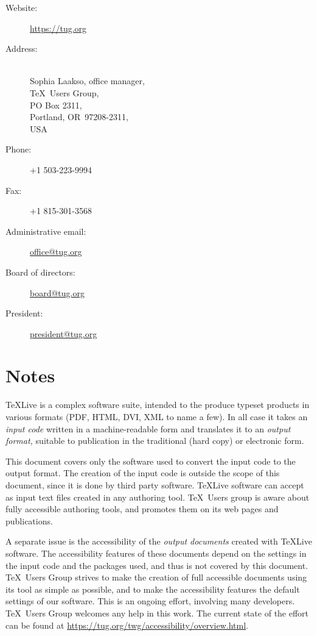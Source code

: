 \documentclass[titlepage]{article}
\begin{document}
  \begin{description}
  \item[Website:]  \url{https://tug.org}
  \item[Address:] \leavevmode\\
    Sophia Laakso, office manager,\\
    \TeX\ Users Group,\\
    PO Box 2311,\\
    Portland, OR~97208-2311,\\
    USA
  \item[Phone:] +1 503-223-9994
  \item[Fax:] +1 815-301-3568
  \item[Administrative email:] \href{mailto:office@tug.org}{office@tug.org}
  \item[Board of directors:] \href{mailto:board@tug.org}{board@tug.org}
  \item[President:] \href{mailto:president@tug.org}{president@tug.org}
  \end{description}

\newpage

\section{Notes}
\label{sec:note}

  
\TeX Live is a complex software suite, intended to the produce typeset
products in various formats (PDF, HTML, DVI, XML to name a few).  In
all case it takes an \emph{input code} written in a machine-readable
form and translates it to an \emph{output format,} suitable to
publication in the traditional (hard copy) or electronic form.

This document covers only the software used to convert the input code
to the output format.  The creation of the input code is outside the
scope of this document, since it is done by third party software.
\TeX Live software can accept as input text files created in any
authoring tool.  \TeX\ Users group is aware about fully accessible
authoring tools, and promotes them on its web pages and publications.

A separate issue is the accessibility of the \emph{output documents}
created with \TeX Live software.  The accessibility features of these
documents depend on the settings in the input code and the packages
used, and thus is not covered by this document.  \TeX\ Users Group
strives to make the creation of full accessible documents using its
tool as simple as possible, and to make the accessibility features the
default settings of our software.  This is an ongoing effort,
involving many developers.  \TeX\ Users Group welcomes any help in
this work.  The current state of the effort can be found at
\url{https://tug.org/twg/accessibility/overview.html}. 
\end{document}
